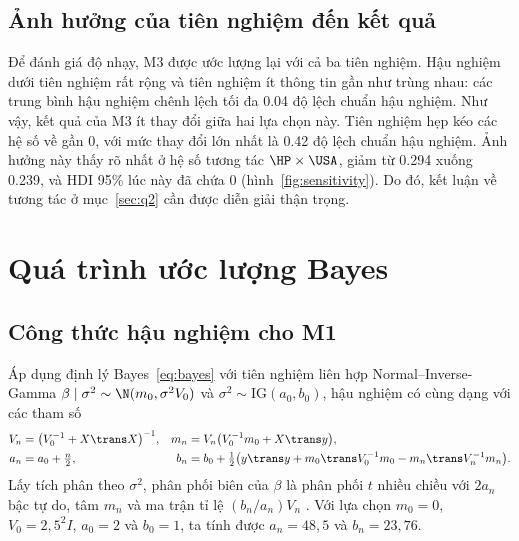 \documentclass[12pt,a4paper]{report}
\begin{document}

\section{Ảnh hưởng của tiên nghiệm đến kết quả}
\label{sec:sensitivity}

Để đánh giá độ nhạy, M3 được ước lượng lại với cả ba tiên nghiệm. Hậu nghiệm
dưới tiên nghiệm rất rộng và tiên nghiệm ít thông tin gần như trùng nhau: các
trung bình hậu nghiệm chênh lệch tối đa \num{0.04} độ lệch chuẩn hậu nghiệm.
Như vậy, kết quả của M3 ít thay đổi giữa hai lựa chọn này. Tiên nghiệm hẹp kéo
các hệ số về gần 0, với mức thay đổi lớn nhất là
\num{0.42} độ lệch chuẩn hậu nghiệm. Ảnh hưởng này thấy rõ nhất ở hệ số tương tác
$\HP \times \USA$, giảm từ \num{0.294} xuống \num{0.239}, và HDI 95\% lúc này đã
chứa 0 (hình~\ref{fig:sensitivity}). Do đó, kết luận về tương tác ở
mục~\ref{sec:q2} cần được diễn giải thận trọng.


\chapter{Quá trình ước lượng Bayes}
\label{sec:estimation}

\section{Công thức hậu nghiệm cho M1}
\label{sec:conjugate}

Áp dụng định lý Bayes~\eqref{eq:bayes} với tiên nghiệm liên hợp Normal--Inverse-Gamma $\beta \mid \sigma^2 \sim
\N(m_0, \sigma^2 V_0)$ và $\sigma^2 \sim \text{IG}(a_0, b_0)$, hậu nghiệm có cùng
dạng với các tham số
%
\begin{equation}
  \label{eq:nig}
  \begin{aligned}
    V_n &= \bigl(V_0^{-1} + X\trans X\bigr)^{-1}, &
    m_n &= V_n \bigl(V_0^{-1} m_0 + X\trans y\bigr), \\
    a_n &= a_0 + \tfrac{n}{2}, &
    b_n &= b_0 + \tfrac{1}{2}\bigl(y\trans y + m_0\trans V_0^{-1} m_0 - m_n\trans V_n^{-1} m_n\bigr).
  \end{aligned}
\end{equation}
%
Lấy tích phân theo $\sigma^2$, phân phối biên của $\beta$ là phân phối $t$ nhiều
chiều với $2a_n$ bậc tự do, tâm $m_n$ và ma trận tỉ lệ $(b_n / a_n) V_n$
\cite{gelman2013bda}. Với lựa chọn $m_0 = 0$, $V_0 = 2{,}5^2 I$, $a_0 = 2$ và
$b_0 = 1$, ta tính được $a_n = 48{,}5$ và $b_n = 23{,}76$.
\end{document}
